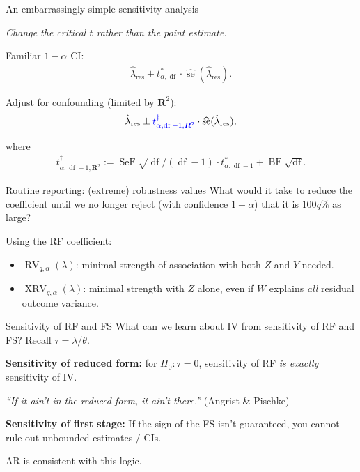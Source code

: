 \documentclass[xcolor=dvipsnames]{beamer}
\newcommand{\R}{{\bm R}}
\DeclareMathOperator{\se}{se}
\DeclareMathOperator{\df}{df}
\DeclareMathOperator{\rv}{RV}
\DeclareMathOperator{\xrv}{XRV}
\DeclareMathOperator{\BF}{BF}
\DeclareMathOperator{\SeF}{SeF}
\begin{document}
\begin{frame}{An embarrassingly simple sensitivity analysis}
\begin{center}
\textit{Change the critical $t$ rather than the point estimate.}
\end{center}
\medskip

 Familiar $1-\alpha$ CI:
\begin{align*}
\hat{\lambda}_{\text{res}} \pm t^*_{\alpha, \df} \cdot \widehat{\se}(\hat{\lambda}_{\text{res}}).
\end{align*}

 Adjust for confounding (limited by $\R^2$):
\begin{align*}
\hat{\lambda}_{\text{res}} \pm \textcolor{blue}{t^\dagger_{\alpha, \df-1, \R^2}} \cdot \widehat{\se}(\hat{\lambda}_{\text{res}}),
\end{align*}

 where
\begin{align*}
t^\dagger_{\alpha, \df-1, \R^2} := \SeF\sqrt{\df/(\df-1)} \cdot t^*_{\alpha, \df-1} + \BF\sqrt{\df}.
\end{align*}
\end{frame}


\begin{frame}{Routine reporting: (extreme) robustness values}
What would it take to reduce the coefficient until we no longer reject (with confidence $1-\alpha$) that it is $100q\%$ as large?
\bigskip

 Using the RF coefficient:
\begin{itemize}
\item $\rv_{q,\alpha}(\lambda)$: minimal strength of association with both $Z$ and $Y$ needed.
\medskip
\item $\xrv_{q,\alpha}(\lambda)$: minimal strength with $Z$ alone, even if $W$ explains \textit{all} residual outcome variance.
\end{itemize}
\end{frame}


\begin{frame}{Sensitivity of RF and FS}
\small
{} What can we learn about IV from sensitivity of RF and FS?
\medskip
{} Recall ${\tau} = {\lambda}/{\theta}$.

 \textbf{Sensitivity of reduced form:} for $H_0: \tau = 0$, sensitivity of RF \textit{is exactly} sensitivity of IV.
\begin{center}
\textit{``If it ain't in the reduced form, it ain't there.''} (Angrist \& Pischke)
\end{center}

 \textbf{Sensitivity of first stage:} If the sign of the FS isn't guaranteed, you cannot rule out unbounded estimates / CIs.

 AR is consistent with this logic.
\end{frame}
\end{document}
